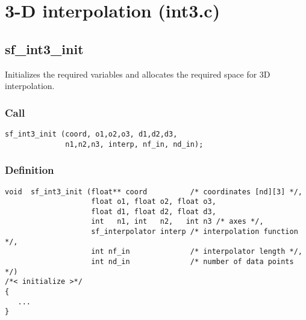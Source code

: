 \section{3-D interpolation (int3.c)}




\subsection{{sf\_int3\_init}}\label{sec:sf_int3_init}
Initializes the required variables and allocates the required space for 3D interpolation.

\subsubsection*{Call}
\begin{verbatim}
sf_int3_init (coord, o1,o2,o3, d1,d2,d3, 
              n1,n2,n3, interp, nf_in, nd_in);
\end{verbatim}

\subsubsection*{Definition}
\begin{verbatim}
void  sf_int3_init (float** coord          /* coordinates [nd][3] */, 
                    float o1, float o2, float o3,
                    float d1, float d2, float d3,
                    int   n1, int   n2,   int n3 /* axes */, 
                    sf_interpolator interp /* interpolation function */, 
                    int nf_in              /* interpolator length */, 
                    int nd_in              /* number of data points */)
/*< initialize >*/
{
   ...
}
\end{verbatim}

